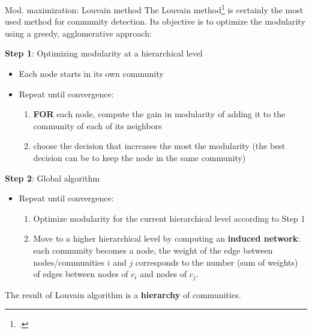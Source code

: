 \documentclass[a4paper,11pt]{book}
\begin{document}
\begin{textbox}{Mod. maximization: Louvain method}
The Louvain method\footcite{blondel2008fast} is certainly the most used method for community detection. Its objective is to optimize the modularity using a greedy, agglomerative approach: 

\textbf{Step 1}: Optimizing modularity at a hierarchical level
\begin{itemize}
    \item Each node starts in its own community
    \item Repeat until convergence:
    \begin{enumerate}
        \item \textbf{FOR} each node, compute the gain in modularity of adding it to the community of each of its neighbors
        \item choose the decision that increases the most the modularity (the best decision can be to keep the node in the same community)
    \end{enumerate}
\end{itemize}

\textbf{Step 2}: Global algorithm
\begin{itemize}
    \item Repeat until convergence:
    \begin{enumerate}
        \item Optimize modularity for the current hierarchical level according to Step 1
        \item Move to a higher hierarchical level by computing an \textbf{induced network}: each community becomes a node, the weight of the edge between nodes/communities $i$ and $j$ corresponds to the number (sum of weights) of edges between nodes of $c_i$ and nodes of $c_j$.
    \end{enumerate}
\end{itemize}

The result of Louvain algorithm is a \textbf{hierarchy} of communities. 

\end{textbox}






\end{document}
